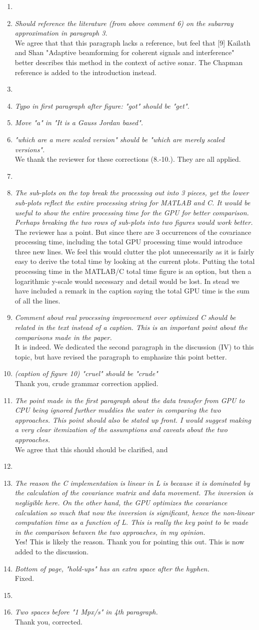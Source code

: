 \documentclass[11pt]{article} %
\newcommand\1{\vec 1}
\newcommand\q[1]{\textit{#1}}
\newcommand\qi[1]{\item\q{#1}}
\newcommand\hi[1]{\item[\textbf{#1}]}
\newcommand\ans[1]{#1}
\newcommand\ai[1]{\\[.5\baselineskip]\ans{#1}}
\begin{document}
\begin{enumerate}
%
\hi{Section II}
\qi{Should reference the literature (from above comment 6) on the subarray approximation in paragraph 3.}
\ai{We agree that that this paragraph lacks a reference, but feel that [9] Kailath and Shan "Adaptive beamforming for coherent signals and interference" better describes this method in the context of active sonar. The Chapman reference is added to the introduction instead.}
%
\hi{Section III (A-C)}
\qi{Typo in first paragraph after figure: "got" should be "get".}
\qi{Move "a" in "It is a Gauss Jordan based".}
\qi{"which are a mere scaled version" should be "which are merely scaled versions".}
\ai{We thank the reviewer for these corrections (8.-10.). They are all applied.}
%
\hi{Section IV}
\qi{The sub-plots on the top break the processing out into 3 pieces, yet the lower sub-plots reflect the entire processing string for MATLAB and C. It would be useful to show the entire processing time for the GPU for better comparison. Perhaps breaking the two rows of sub-plots into two figures would work better.}
\ai{The reviewer has a point. But since there are 3 occurrences of the covariance processing time, including the total GPU processing time would introduce three new lines. We feel this would clutter the plot unnecessarily as it is fairly easy to derive the total time by looking at the current plots. Putting the total processing time in the MATLAB/C total time figure is an option, but then a logarithmic y-scale would necessary and detail would be lost. In stead we have included a remark in the caption saying the total GPU time is the sum of all the lines.}
%
\qi{Comment about real processing improvement over optimized C should be related in the text instead of a caption. This is an important point about the comparisons made in the paper.}
\ai{It is indeed. We dedicated the second paragraph in the discussion (IV) to this topic, but have revised the paragraph to emphasize this point better.}
%
\qi{(caption of figure 10) "cruel" should be "crude"}
\ai{Thank you, crude grammar correction applied.}
%
\qi{The point made in the first paragraph about the data transfer from GPU to CPU being ignored further muddies the water in comparing the two approaches. This point should also be stated up front. I would suggest making a very clear itemization of the assumptions and caveats about the two approaches.}
\ai{We agree that this should should be clarified, and }
%
\hi{Section V}
\qi{The reason the C implementation is linear in L is because it is dominated by the calculation of the covariance matrix and data movement. The inversion is negligible here. On the other hand, the GPU optimizes the covariance calculation so much that now the inversion is significant, hence the non-linear computation time as a function of L. This is really the key point to be made in the comparison between the two approaches, in my opinion.}
\ai{Yes! This is likely the reason. Thank you for pointing this out. This is now added to the discussion.}
\qi{Bottom of page, "hold-ups" has an extra space after the hyphen.}
\ai{Fixed.}
\hi{Section V}
\qi{Two spaces before "1 Mpx/s" in 4th paragraph. }
\ai{Thank you, corrected.}
\end{enumerate}
\end{document}
